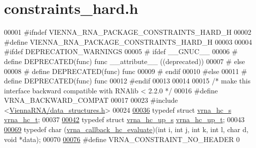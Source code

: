 \hypertarget{constraints__hard_8h_source}{}\section{constraints\+\_\+hard.\+h}
\label{constraints__hard_8h_source}

\begin{DoxyCode}
00001 \textcolor{preprocessor}{#ifndef VIENNA\_RNA\_PACKAGE\_CONSTRAINTS\_HARD\_H}
00002 \textcolor{preprocessor}{#define VIENNA\_RNA\_PACKAGE\_CONSTRAINTS\_HARD\_H}
00003 
00004 \textcolor{preprocessor}{#ifdef DEPRECATION\_WARNINGS}
00005 \textcolor{preprocessor}{# ifdef \_\_GNUC\_\_}
00006 \textcolor{preprocessor}{#  define DEPRECATED(func) func \_\_attribute\_\_ ((deprecated))}
00007 \textcolor{preprocessor}{# else}
00008 \textcolor{preprocessor}{#  define DEPRECATED(func) func}
00009 \textcolor{preprocessor}{# endif}
00010 \textcolor{preprocessor}{#else}
00011 \textcolor{preprocessor}{# define DEPRECATED(func) func}
00012 \textcolor{preprocessor}{#endif}
00013 
00014 
00015 \textcolor{comment}{/* make this interface backward compatible with RNAlib < 2.2.0 */}
00016 \textcolor{preprocessor}{#define VRNA\_BACKWARD\_COMPAT}
00017 
00023 \textcolor{preprocessor}{#include <\hyperlink{data__structures_8h}{ViennaRNA/data\_structures.h}>}
00024 
\hypertarget{constraints__hard_8h_source_l00036}{}\hyperlink{group__hard__constraints_gac7e4c4f8abe3163a68110c5bff24e01d}{00036} \textcolor{keyword}{typedef} \textcolor{keyword}{struct  }\hyperlink{group__hard__constraints_structvrna__hc__s}{vrna\_hc\_s} \hyperlink{group__hard__constraints_structvrna__hc__s}{vrna\_hc\_t};
00037 
\hypertarget{constraints__hard_8h_source_l00042}{}\hyperlink{group__hard__constraints_ga8cd53427a942a81c87ec526bbff32ef9}{00042} \textcolor{keyword}{typedef} \textcolor{keyword}{struct }\hyperlink{group__hard__constraints_structvrna__hc__up__s}{vrna\_hc\_up\_s} \hyperlink{group__hard__constraints_structvrna__hc__up__s}{vrna\_hc\_up\_t};
00043 
\hypertarget{constraints__hard_8h_source_l00069}{}\hyperlink{group__hard__constraints_ga16eb71ac9a7a35369be2eaa9d8f8dfa0}{00069} \textcolor{keyword}{typedef} char (\hyperlink{group__hard__constraints_ga16eb71ac9a7a35369be2eaa9d8f8dfa0}{vrna\_callback\_hc\_evaluate})(\textcolor{keywordtype}{int} i, \textcolor{keywordtype}{int} j, \textcolor{keywordtype}{int} k, \textcolor{keywordtype}{int} l, \textcolor{keywordtype}{char} d, \textcolor{keywordtype}{void} 
      *data);
00070 
\hypertarget{constraints__hard_8h_source_l00076}{}\hyperlink{constraints__hard_8h_a08d12a9a846ea593b7171d277c9f033f}{00076} \textcolor{preprocessor}{#define VRNA\_CONSTRAINT\_NO\_HEADER         0}

\end{DoxyCode}
